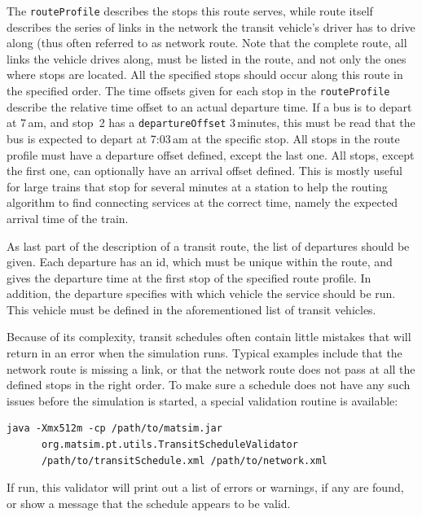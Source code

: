 The \lstinline|routeProfile| describes the stops this route serves, while route itself describes the series of links in the network the transit vehicle's driver has to drive along (thus often referred to as network route. Note that the complete route, \ie all links the vehicle drives along, must be listed in the route, and not only the ones where stops are located. All the specified stops should occur along this route in the specified order. The time offsets given for each stop in the \lstinline|routeProfile| describe the relative time offset to an actual departure time. If a bus is to depart at 7\,am, and stop~2 has a \lstinline|departureOffset| 3\,minutes, this must be read that the bus is expected to depart at 7:03\,am at the specific stop. All stops in the route profile must have a departure offset defined, except the last one. All stops, except the first one, can optionally have an arrival offset defined. This is mostly useful for large trains that stop for several minutes at a station to help the routing algorithm to find connecting services at the correct time, namely the expected arrival time of the train.

As last part of the description of a transit route, the list of departures should be given. Each departure has an id, which must be unique within the route, and gives the departure time at the first stop of the specified route profile. In addition, the departure specifies with which vehicle the service should be run. This vehicle must be defined in the aforementioned list of transit vehicles. 

Because of its complexity, transit schedules often contain little mistakes that will return in an error when the simulation runs. Typical examples include that the network route is missing a link, or that the network route does not pass at all the defined stops in the right order. To make sure a schedule does not have any such issues before the simulation is started, a special validation routine is available:
%
\begin{lstlisting}
java -Xmx512m -cp /path/to/matsim.jar  
      org.matsim.pt.utils.TransitScheduleValidator  
      /path/to/transitSchedule.xml /path/to/network.xml
\end{lstlisting}
%
If run, this validator will print out a list of errors or warnings, if any are found, or show a message that the schedule appears to be valid.

